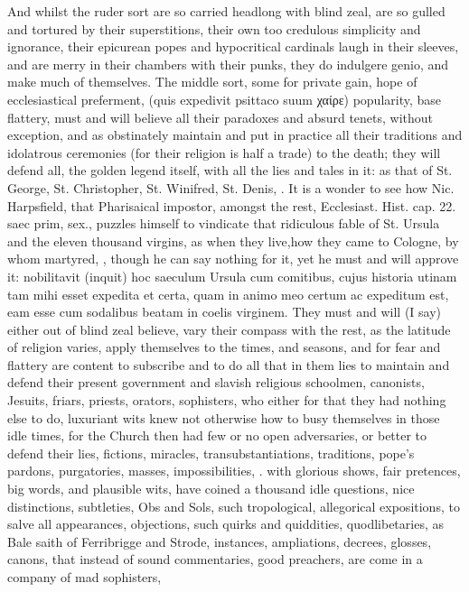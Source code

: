 {And whilst the ruder sort are so carried headlong with blind zeal, are
so gulled and tortured by their superstitions, their own too credulous
simplicity and ignorance, their epicurean popes and hypocritical
cardinals laugh in their sleeves, and are merry in their chambers with
their punks, they do indulgere genio, and make much of themselves. The
middle sort, some for private gain, hope of ecclesiastical preferment,
(quis expedivit psittaco suum χαίρε) popularity, base flattery, must
and will believe all their paradoxes and absurd tenets, without
exception, and as obstinately maintain and put in practice all their
traditions and idolatrous ceremonies (for their religion is half a
trade) to the death; they will defend all, the golden legend itself,
with all the lies and tales in it: as that of St. George, St.
Christopher, St. Winifred, St. Denis, \etc{}. It is a wonder to see how
Nic. Harpsfield, that Pharisaical impostor, amongst the rest,
Ecclesiast. Hist. cap. 22. saec prim, sex., puzzles himself to
vindicate that ridiculous fable of St. Ursula and the eleven thousand
virgins, as when they live,how they came to Cologne, by whom
martyred, \etc{}, though he can say nothing for it, yet he must and will
approve it: nobilitavit (inquit) hoc saeculum Ursula cum comitibus,
cujus historia utinam tam mihi esset expedita et certa, quam in animo
meo certum ac expeditum est, eam esse cum sodalibus beatam in coelis
virginem. They must and will (I say) either out of blind zeal believe,
vary their compass with the rest, as the latitude of religion varies,
apply themselves to the times, and seasons, and for fear and flattery
are content to subscribe and to do all that in them lies to maintain
and defend their present government and slavish religious schoolmen,
canonists, Jesuits, friars, priests, orators, sophisters, who either
for that they had nothing else to do, luxuriant wits knew not otherwise
how to busy themselves in those idle times, for the Church then had few
or no open adversaries, or better to defend their lies, fictions,
miracles, transubstantiations, traditions, pope's pardons, purgatories,
masses, impossibilities, \etc{}. with glorious shows, fair pretences, big
words, and plausible wits, have coined a thousand idle questions, nice
distinctions, subtleties, Obs and Sols, such tropological, allegorical
expositions, to salve all appearances, objections, such quirks and
quiddities, quodlibetaries, as Bale saith of Ferribrigge and Strode,
instances, ampliations, decrees, glosses, canons, that instead of sound
commentaries, good preachers, are come in a company of mad sophisters,
}
